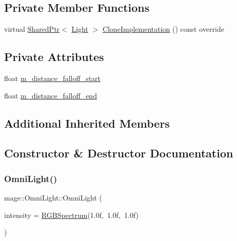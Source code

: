 \subsection*{Private Member Functions}
\begin{DoxyCompactItemize}
\item 
virtual \hyperlink{namespacemage_a1e01ae66713838a7a67d30e44c67703e}{Shared\+Ptr}$<$ \hyperlink{classmage_1_1_light}{Light} $>$ \hyperlink{classmage_1_1_omni_light_ac2f028466785d00ab8be1754e4acc516}{Clone\+Implementation} () const override
\end{DoxyCompactItemize}
\subsection*{Private Attributes}
\begin{DoxyCompactItemize}
\item 
float \hyperlink{classmage_1_1_omni_light_ab784744d39ad3d4f4a7b2214a55108f7}{m\+\_\+distance\+\_\+falloff\+\_\+start}
\item 
float \hyperlink{classmage_1_1_omni_light_a4ee5cc4103305dc96b43d6286858ef74}{m\+\_\+distance\+\_\+falloff\+\_\+end}
\end{DoxyCompactItemize}
\subsection*{Additional Inherited Members}


\subsection{Constructor \& Destructor Documentation}
\hypertarget{classmage_1_1_omni_light_a94794dd7c19fcac0c0d0b9d83108513b}{}\label{classmage_1_1_omni_light_a94794dd7c19fcac0c0d0b9d83108513b} 
\subsubsection{\texorpdfstring{Omni\+Light()}{OmniLight()}\hspace{0.1cm}{\footnotesize\ttfamily [1/3]}}
{\footnotesize\ttfamily mage\+::\+Omni\+Light\+::\+Omni\+Light (\begin{DoxyParamCaption}\item[{const \hyperlink{structmage_1_1_r_g_b_spectrum}{R\+G\+B\+Spectrum} \&}]{intensity = {\ttfamily \hyperlink{structmage_1_1_r_g_b_spectrum}{R\+G\+B\+Spectrum}(1.0f,~1.0f,~1.0f)} }\end{DoxyParamCaption})\hspace{0.3cm}{\ttfamily [explicit]}}

